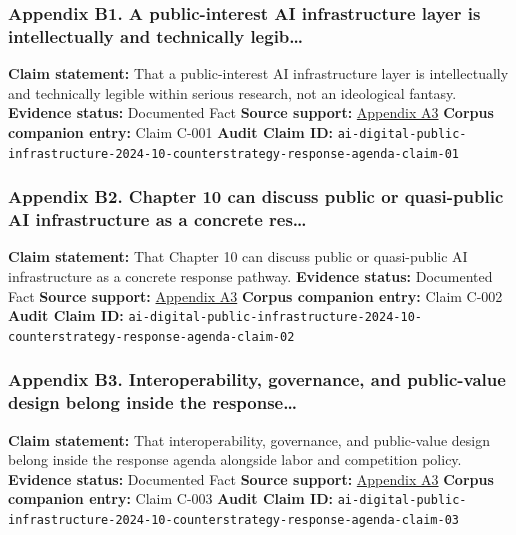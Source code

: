 \documentclass[
  american,
  11pt,
  letterpaper,
]{article}
\begin{document}
\subsubsection{Appendix B1. A public-interest AI infrastructure layer is
intellectually and technically
legib\ldots{}}\label{ch-10-appendix-b1-a-public-interest-ai-infrastructure-layer-is-intellectually-and-technically-legib}

\textbf{Claim statement:} That a public-interest AI infrastructure layer
is intellectually and technically legible within serious research, not
an ideological fantasy. \textbf{Evidence status:} Documented Fact
\textbf{Source support:}
\hyperref[ch-10-appendix-a3-interactions-between-artificial-intelligence-and-digital-public-infrastructure-concepts-benefits-and-challenges]{Appendix
A3} \textbf{Corpus companion entry:} Claim C-001 \textbf{Audit Claim
ID:}
\texttt{ai-digital-public-infrastructure-2024-10-counterstrategy-response-agenda-claim-01}

\subsubsection{Appendix B2. Chapter 10 can discuss public or
quasi-public AI infrastructure as a concrete
res\ldots{}}\label{ch-10-appendix-b2-chapter-10-can-discuss-public-or-quasi-public-ai-infrastructure-as-a-concrete-res}

\textbf{Claim statement:} That Chapter 10 can discuss public or
quasi-public AI infrastructure as a concrete response pathway.
\textbf{Evidence status:} Documented Fact \textbf{Source support:}
\hyperref[ch-10-appendix-a3-interactions-between-artificial-intelligence-and-digital-public-infrastructure-concepts-benefits-and-challenges]{Appendix
A3} \textbf{Corpus companion entry:} Claim C-002 \textbf{Audit Claim
ID:}
\texttt{ai-digital-public-infrastructure-2024-10-counterstrategy-response-agenda-claim-02}

\subsubsection{Appendix B3. Interoperability, governance, and
public-value design belong inside the
response\ldots{}}\label{ch-10-appendix-b3-interoperability-governance-and-public-value-design-belong-inside-the-response}

\textbf{Claim statement:} That interoperability, governance, and
public-value design belong inside the response agenda alongside labor
and competition policy. \textbf{Evidence status:} Documented Fact
\textbf{Source support:}
\hyperref[ch-10-appendix-a3-interactions-between-artificial-intelligence-and-digital-public-infrastructure-concepts-benefits-and-challenges]{Appendix
A3} \textbf{Corpus companion entry:} Claim C-003 \textbf{Audit Claim
ID:}
\texttt{ai-digital-public-infrastructure-2024-10-counterstrategy-response-agenda-claim-03}
\end{document}
